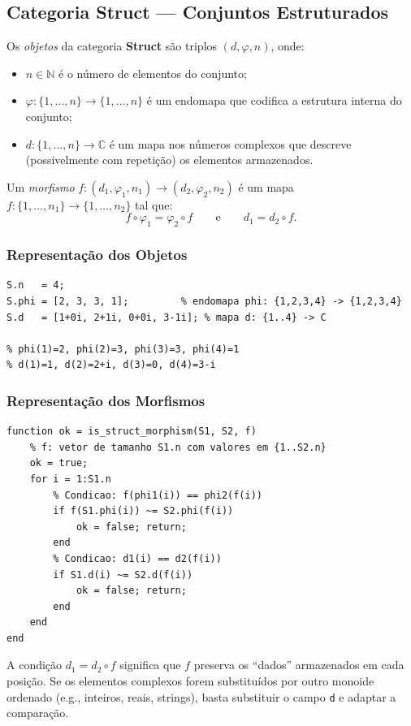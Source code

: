 \subsection{Categoria \textbf{Struct} --- Conjuntos Estruturados}
\label{subsec:struct}

\begin{definition}
Os \emph{objetos} da categoria \textbf{Struct} são triplos $(d, \varphi, n)$, onde:
\begin{itemize}
    \item $n \in \mathbb{N}$ é o número de elementos do conjunto;
    \item $\varphi: \{1,\ldots,n\} \to \{1,\ldots,n\}$ é um endomapa que codifica a estrutura interna do conjunto;
    \item $d: \{1,\ldots,n\} \to \mathbb{C}$ é um mapa nos números complexos que descreve (possivelmente com repetição) os elementos armazenados.
\end{itemize}
Um \emph{morfismo} $f: (d_1, \varphi_1, n_1) \to (d_2, \varphi_2, n_2)$ é um mapa $f: \{1,\ldots,n_1\} \to \{1,\ldots,n_2\}$ tal que:
\[
    f \circ \varphi_1 = \varphi_2 \circ f \qquad \text{e} \qquad d_1 = d_2 \circ f.
\]
\end{definition}

\subsubsection{Representação dos Objetos}

\begin{lstlisting}[style=matlab, caption={Representação de um objeto de Struct em MATLAB/Octave}]
% Objeto S = (d, phi, n)
S.n   = 4;
S.phi = [2, 3, 3, 1];         % endomapa phi: {1,2,3,4} -> {1,2,3,4}
S.d   = [1+0i, 2+1i, 0+0i, 3-1i]; % mapa d: {1..4} -> C

% phi(1)=2, phi(2)=3, phi(3)=3, phi(4)=1
% d(1)=1, d(2)=2+i, d(3)=0, d(4)=3-i
\end{lstlisting}

\subsubsection{Representação dos Morfismos}

\begin{lstlisting}[style=matlab, caption={Verificação de um morfismo de Struct}]
function ok = is_struct_morphism(S1, S2, f)
    % f: vetor de tamanho S1.n com valores em {1..S2.n}
    ok = true;
    for i = 1:S1.n
        % Condicao: f(phi1(i)) == phi2(f(i))
        if f(S1.phi(i)) ~= S2.phi(f(i))
            ok = false; return;
        end
        % Condicao: d1(i) == d2(f(i))
        if S1.d(i) ~= S2.d(f(i))
            ok = false; return;
        end
    end
end
\end{lstlisting}

\begin{remark}
A condição $d_1 = d_2 \circ f$ significa que $f$ preserva os ``dados'' armazenados em cada posição. Se os elementos complexos forem substituídos por outro monoide ordenado (e.g., inteiros, reais, strings), basta substituir o campo \texttt{d} e adaptar a comparação.
\end{remark}